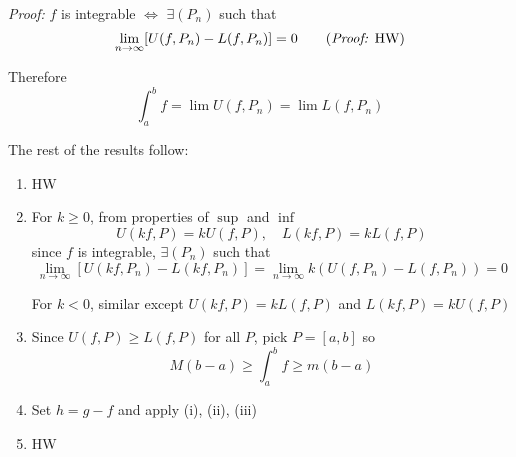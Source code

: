 \documentclass[12pt]{report}
\newcommand{\R}{\mathbb{R}}
\newcommand{\abs}[1]{\left\vert #1 \right\vert}
\newenvironment*{tbox}[2][gray]{
    \begin{tcolorbox}[
        parbox=false,
        colback=#1!5!white,
        colframe=#1!75!black,
        breakable,
        title={#2}
    ]}
    {\end{tcolorbox}}
\begin{document}
        \begin{tbox}{\textbf{Theorem:} Assume $f, g$ are integrable on $[a, b]$. Then 
            \begin{enumerate}[label=(\roman*)]
                \item $f + g$ is integrable on $[a, b]$ with $\int_a^b(f + g) = \int_a^b f + \int_a^b g$ 
                \item $kf$ is integrable on $[a, b]$ for any $k \in \R$ with $\int_a^b kf = k\int_a^b f$
                \item If $m \leq f(x) \leq M$ on $[a, b]$, then $m(b - a) \leq \int_a^b f \leq M(b - a)$
                \item $f(x) \leq g(x)$ for all $x \in [a, b]$ implies $\int_a^b f \leq \int_a^b g$
                \item $\abs{f}$ is integrable and $\abs{\int_a^b f} \leq \int_a^b \abs{f}$
            \end{enumerate}}
            \emph{Proof:} $f$ is integrable $\iff$ $\exists (P_n)$ such that 
            \[\lim_{n \to \infty} [U(f, P_n) - L(f, P_n)] = 0 \qquad \text{(\emph{Proof:} HW)}\]

            Therefore
            \[\int_a^b f = \lim U(f, P_n) = \lim L(f, P_n)\]

            The rest of the results follow:
            \begin{enumerate}[label=(\roman*)]
                \item HW 
                
                \item For $k \geq 0$, from properties of $\sup$ and $\inf$ 
                \[U(kf, P) = kU(f, P), \quad L(kf, P) = kL(f, P)\]
                since $f$ is integrable, $\exists (P_n)$ such that 
                \[\lim_{n\to \infty}[U(kf, P_n) - L(kf, P_n)] = \lim_{n \to \infty} k(U(f, P_n) - L(f, P_n)) = 0\]

                For $k < 0$, similar except $U(kf, P) = kL(f, P)$ and $L(kf, P) = kU(f, P)$

                \item Since $U(f, P )\geq L(f, P)$ for all $P$, pick $P = [a, b]$ so 
                \[M(b- a) \geq \int_a^b f \geq m(b - a)\] 

                \item Set $h = g - f$ and apply (i), (ii), (iii) 
                
                \item HW
            \end{enumerate}
        \end{tbox}
\end{document}
